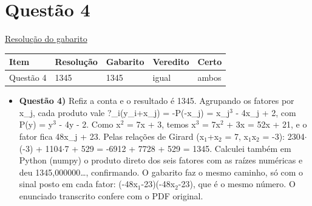 \documentclass{article}%
\begin{document}
\section*{Questão 4}%
\href{https://poliedroresolve.sistemapoliedro.com.br/vestibulares/ime/2027/ime-2-fase-dia-1-26-10-2026-2-fase-dia-1/dissertativa-4-matematica-2-fase-dia-1-ime-2027}{Resolução do gabarito}\par\smallskip%
\begin{longtable}{@{}p{} p{} p{} p{} p{}@{}}\toprule Item & Resolução & Gabarito & Veredito & Certo \\ \midrule
Questão 4 & 1345 & 1345 & igual & ambos \\
\bottomrule\end{longtable}%
\begin{itemize}%
\item%
\textbf{Questão 4)} Refiz a conta e o resultado é 1345. Agrupando os fatores por x\_j, cada produto vale ?\_i(y\_i+x\_j) = -P(-x\_j) = x\_j$^3$ - 4x\_j + 2, com P(y) = y$^3$ - 4y - 2. Como x$^2$ = 7x + 3, temos x$^3$ = 7x$^2$ + 3x = 52x + 21, e o fator fica 48x\_j + 23. Pelas relações de Girard (x$_{1}$+x$_{2}$ = 7, x$_{1}$x$_{2}$ = -3): 2304$\cdot$(-3) + 1104$\cdot$7 + 529 = -6912 + 7728 + 529 = 1345. Calculei também em Python (numpy) o produto direto dos seis fatores com as raízes numéricas e deu 1345,000000\ldots{}, confirmando. O gabarito faz o mesmo caminho, só com o sinal posto em cada fator: (-48x$_{1}$-23)(-48x$_{2}$-23), que é o mesmo número. O enunciado transcrito confere com o PDF original.%
\end{itemize}%
\end{document}
